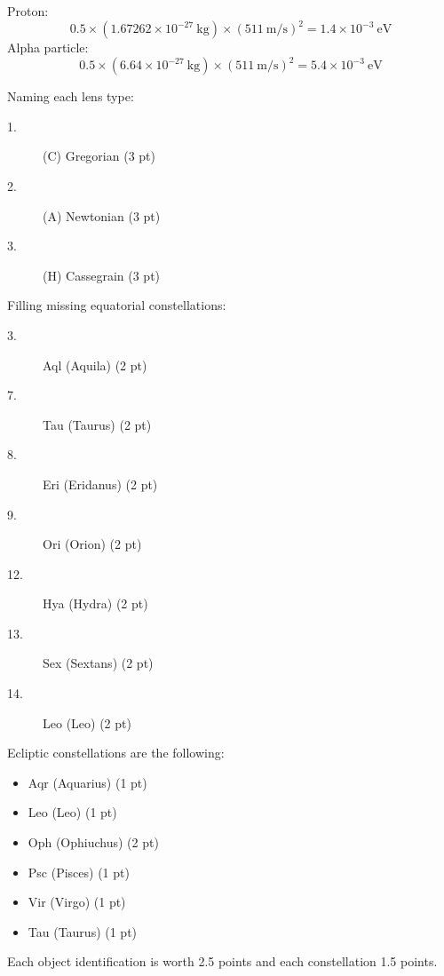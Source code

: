 \begin{enumerate}
  Proton:
  \[
  0.5 \times (1.67262\times10^{-27}~\mathrm{kg}) \times (511~\mathrm{m/s})^2
  = 1.4\times10^{-3}~\mathrm{eV}
  \]
  Alpha particle:
  \[
  0.5 \times (6.64\times10^{-27}~\mathrm{kg}) \times (511~\mathrm{m/s})^2
  = 5.4\times10^{-3}~\mathrm{eV}
  \]
\end{enumerate}

Naming each lens type: %
\begin{description}
\item[1.] (C) Gregorian \hfill(3 pt)
\item[2.] (A) Newtonian \hfill(3 pt)
\item[3.] (H) Cassegrain \hfill(3 pt)
\end{description}

Filling missing equatorial constellations:
\begin{description}
\item[3.] Aql (Aquila) \hfill(2 pt)
\item[7.] Tau (Taurus) \hfill(2 pt)
\item[8.] Eri (Eridanus) \hfill(2 pt)
\item[9.] Ori (Orion) \hfill(2 pt)
\item[12.] Hya (Hydra) \hfill(2 pt)
\item[13.] Sex (Sextans) \hfill(2 pt)
\item[14.] Leo (Leo) \hfill(2 pt)
\end{description}

Ecliptic constellations are the following:
\begin{itemize}
\item Aqr (Aquarius) \hfill(1 pt)
\item Leo (Leo) \hfill(1 pt)
\item Oph (Ophiuchus) \hfill(2 pt)
\item Psc (Pisces) \hfill(1 pt)
\item Vir (Virgo) \hfill(1 pt)
\item Tau (Taurus) \hfill(1 pt)
\end{itemize}

Each object identification is worth 2.5 points and each constellation 1.5
points.

